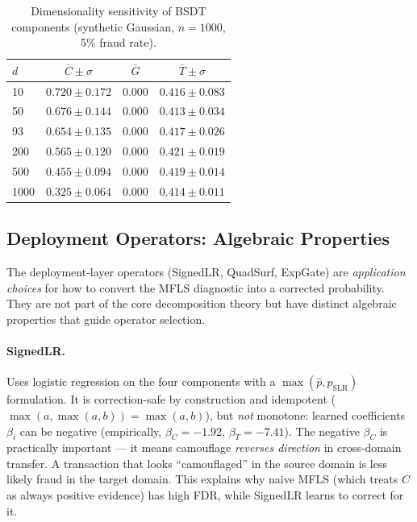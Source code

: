 \documentclass[journal]{IEEEtran}
\begin{document}
\begin{table}[t]
\centering
\caption{Dimensionality sensitivity of BSDT components (synthetic Gaussian, $n=1000$, 5\% fraud rate).}
\label{tab:inv-dim}
\small
\begin{tabular}{l c c c}
\toprule
$d$ & $\bar{C} \pm \sigma$ & $\bar{G}$ & $\bar{T} \pm \sigma$ \\
\midrule
10   & $0.720 \pm 0.172$ & 0.000 & $0.416 \pm 0.083$ \\
50   & $0.676 \pm 0.144$ & 0.000 & $0.413 \pm 0.034$ \\
93   & $0.654 \pm 0.135$ & 0.000 & $0.417 \pm 0.026$ \\
200  & $0.565 \pm 0.120$ & 0.000 & $0.421 \pm 0.019$ \\
500  & $0.455 \pm 0.094$ & 0.000 & $0.419 \pm 0.014$ \\
1000 & $0.325 \pm 0.064$ & 0.000 & $0.414 \pm 0.011$ \\
\bottomrule
\end{tabular}
\end{table}

\subsection{Deployment Operators: Algebraic Properties}

The deployment-layer operators (SignedLR, QuadSurf, ExpGate) are \emph{application choices} for how to convert the MFLS diagnostic into a corrected probability.  They are not part of the core decomposition theory but have distinct algebraic properties that guide operator selection.

\paragraph{SignedLR.}
Uses logistic regression on the four components with a $\max(\hat{p}, p_{\text{SLR}})$ formulation.  It is correction-safe by construction and idempotent ($\max(a, \max(a, b)) = \max(a, b)$), but \emph{not} monotone: learned coefficients $\beta_i$ can be negative (empirically, $\beta_C = -1.92$, $\beta_T = -7.41$).  The negative $\beta_C$ is practically important --- it means camouflage \emph{reverses direction} in cross-domain transfer.  A transaction that looks ``camouflaged'' in the source domain is less likely fraud in the target domain.  This explains why naive MFLS (which treats $C$ as always positive evidence) has high FDR, while SignedLR learns to correct for it.
\end{document}

